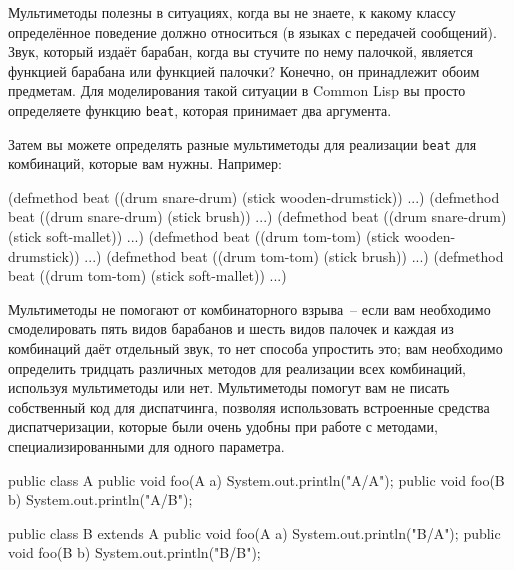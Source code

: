 Мультиметоды полезны в ситуациях, когда вы не знаете, к какому классу определённое
поведение должно относиться (в языках с передачей сообщений).  Звук, который издаёт
барабан, когда вы стучите по нему палочкой, является функцией барабана или функцией
палочки?  Конечно, он принадлежит обоим предметам.  Для моделирования такой ситуации в
Common Lisp вы просто определяете функцию \lstinline{beat}, которая принимает два аргумента.

Затем вы можете определять разные мультиметоды для реализации \lstinline{beat} для комбинаций,
которые вам нужны. Например:

\begin{myverb}
(defmethod beat ((drum snare-drum) (stick wooden-drumstick)) ...)
(defmethod beat ((drum snare-drum) (stick brush)) ...)
(defmethod beat ((drum snare-drum) (stick soft-mallet)) ...)
(defmethod beat ((drum tom-tom) (stick wooden-drumstick)) ...)
(defmethod beat ((drum tom-tom) (stick brush)) ...)
(defmethod beat ((drum tom-tom) (stick soft-mallet)) ...)
\end{myverb}

Мультиметоды не помогают от комбинаторного взрыва~-- если вам необходимо смоделировать
пять видов барабанов и шесть видов палочек и каждая из комбинаций даёт отдельный звук, то
нет способа упростить это; вам необходимо определить тридцать различных методов для
реализации всех комбинаций, используя мультиметоды или нет.  Мультиметоды помогут вам не
писать собственный код для диспатчинга, позволяя использовать встроенные средства
диспатчеризации, которые были очень удобны при работе с методами, специализированными для
одного параметра.

\begin{lrbox}{\chonesixone}
  \begin{minipage}{\linewidth}
\begin{myverb}
public class A {
  public void foo(A a) { System.out.println("A/A"); }
  public void foo(B b) { System.out.println("A/B"); }
}

public class B extends A {
  public void foo(A a) { System.out.println("B/A"); }
  public void foo(B b) { System.out.println("B/B"); }
}
\end{myverb}
  \end{minipage}
\end{lrbox}

